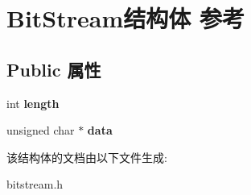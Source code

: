 \hypertarget{struct_bit_stream}{\section{Bit\-Stream结构体 参考}
\label{struct_bit_stream}
}
\subsection*{Public 属性}
\begin{DoxyCompactItemize}
\item 
\hypertarget{struct_bit_stream_a9d7bbee2d63720a8ee8e0f427ae8afe2}{int {\bfseries length}}\label{struct_bit_stream_a9d7bbee2d63720a8ee8e0f427ae8afe2}

\item 
\hypertarget{struct_bit_stream_ad56e6ae32cf87078cbca2eed5536ba2d}{unsigned char $\ast$ {\bfseries data}}\label{struct_bit_stream_ad56e6ae32cf87078cbca2eed5536ba2d}

\end{DoxyCompactItemize}


该结构体的文档由以下文件生成\-:\begin{DoxyCompactItemize}
\item 
bitstream.\-h\end{DoxyCompactItemize}

